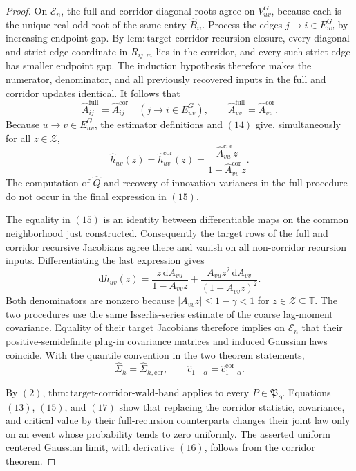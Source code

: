 \documentclass{article}
\begin{document}
\begin{proof}
On \(\mathcal E_n\), the full and corridor diagonal roots agree on
\(V_{uv}^{G}\), because each is the unique real odd root of the same
entry \(\widehat B_{ii}\).  Process the edges \(j\to i\in E_{uv}^{G}\)
by increasing endpoint gap.  By
\(\mathrm{lem{:}target\mbox{-}corridor\mbox{-}recursion\mbox{-}closure}\),
every diagonal and strict-edge coordinate in \(R_{ij,m}\) lies in the
corridor, and every such strict edge has smaller endpoint gap.  The
induction hypothesis therefore makes the numerator, denominator, and all
previously recovered inputs in the full and corridor updates identical.
It follows that
\[
 \widehat A_{ij}^{\mathrm{full}}
 =\widehat A_{ij}^{\mathrm{cor}}
 \quad(j\to i\in E_{uv}^{G}),
 \qquad
 \widehat A_{vv}^{\mathrm{full}}=
 \widehat A_{vv}^{\mathrm{cor}}.
 \tag{14}
\]
Because \(u\to v\in E_{uv}^{G}\), the estimator definitions and \((14)\)
give, simultaneously for all \(z\in\mathcal Z\),
\[
 \widehat h_{uv}(z)
 =\widehat h_{uv}^{\mathrm{cor}}(z)
 =\frac{\widehat A_{vu}^{\mathrm{cor}}z}
 {1-\widehat A_{vv}^{\mathrm{cor}}z}.
 \tag{15}
\]
The computation of \(\widehat Q\) and recovery of innovation variances in
the full procedure do not occur in the final expression in \((15)\).

The equality in \((15)\) is an identity between differentiable maps on
the common neighborhood just constructed.  Consequently the target rows
of the full and corridor recursive Jacobians agree there and vanish on
all non-corridor recursion inputs.  Differentiating the last expression
gives
\[
 \mathrm dh_{uv}(z)
 =\frac{z\,\mathrm dA_{vu}}{1-A_{vv}z}
  +\frac{A_{vu}z^2\,\mathrm dA_{vv}}{(1-A_{vv}z)^2}.
 \tag{16}
\]
Both denominators are nonzero because \(|A_{vv}z|\leq1-\gamma<1\) for
\(z\in\mathcal Z\subseteq\mathbb T\).  The two procedures use the same
Isserlis-series estimate of the coarse lag-moment covariance.  Equality
of their target Jacobians therefore implies on \(\mathcal E_n\) that
their positive-semidefinite plug-in covariance matrices and induced
Gaussian laws coincide.  With the quantile convention in the two theorem
statements,
\[
 \widehat\Sigma_h=\widehat\Sigma_{h,\mathrm{cor}},
 \qquad
 \widehat c_{1-\alpha}
 =\widehat c_{1-\alpha}^{\mathrm{cor}}.
 \tag{17}
\]

By \((2)\),
\(\mathrm{thm{:}target\mbox{-}corridor\mbox{-}wald\mbox{-}band}\)
applies to every \(P\in\mathfrak P_{\partial}\).  Equations
\((13)\), \((15)\), and \((17)\) show that replacing the corridor
statistic, covariance, and critical value by their full-recursion
counterparts changes their joint law only on an event whose probability
tends to zero uniformly.  The asserted uniform centered Gaussian limit,
with derivative \((16)\), follows from the corridor theorem.


\end{proof}
\end{document}
